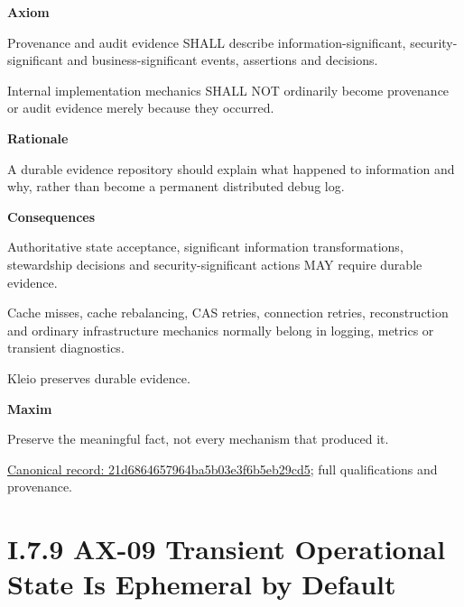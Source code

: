 \par\medskip\textbf{Axiom}\par


Provenance and audit evidence SHALL describe information-significant,
security-significant and business-significant events, assertions and
decisions.



Internal implementation mechanics SHALL NOT ordinarily become provenance
or audit evidence merely because they occurred.



\par\medskip\textbf{Rationale}\par


A durable evidence repository should explain what happened to
information and why, rather than become a permanent distributed debug
log.



\par\medskip\textbf{Consequences}\par


Authoritative state acceptance, significant information transformations,
stewardship decisions and security-significant actions MAY require
durable evidence.



Cache misses, cache rebalancing, CAS retries, connection retries,
reconstruction and ordinary infrastructure mechanics normally belong in
logging, metrics or transient diagnostics.



Kleio preserves durable evidence.



\par\medskip\textbf{Maxim}\par


Preserve the meaningful fact, not every mechanism that produced it.


{\footnotesize \href{../../../../continuum/motivation/principle/21d6864657964ba5b03e3f6b5eb29cd5.md}{Canonical record: 21d6864657964ba5b03e3f6b5eb29cd5}; full qualifications and provenance.}\par
\section*{I.7.9 AX-09 Transient Operational State Is Ephemeral by Default}
\label{navigation:I.7.9}

